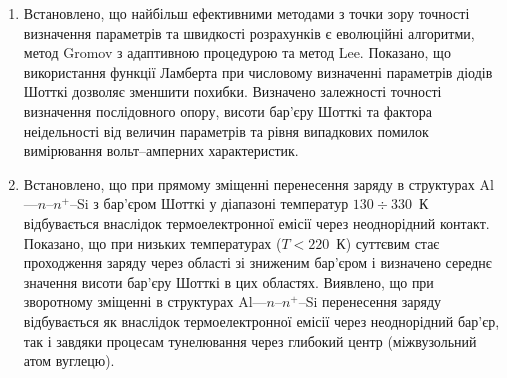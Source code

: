 \begin{enumerate}[leftmargin=0cm,itemindent=3em]
   \item Встановлено, що найбільш ефективними методами з точки зору точності визначення параметрів та швидкості розрахунків є еволюційні алгоритми, метод Gromov з адаптивною процедурою та метод Lee.
    Показано, що використання функції Ламберта при числовому визначенні параметрів діодів Шотткі дозволяє зменшити похибки.
    Визначено залежності точності визначення послідовного опору, висоти бар'єру Шотткі та фактора неідельності від величин параметрів та рівня випадкових помилок вимірювання вольт--амперних характеристик.

   \item
Встановлено, що при прямому зміщенні перенесення заряду в структурах Al---$n$--$n^+$--Si з бар'єром Шотткі у діапазоні температур $130\div330$~К відбувається внаслідок термоелектронної емісії через неоднорідний контакт.
        Показано, що при низьких температурах ($T<220$~К) суттєвим стає проходження заряду через області зі зниженим бар'єром і визначено середнє значення висоти бар'єру Шотткі в цих областях.
     Виявлено, що при зворотному зміщенні в структурах Al---$n$--$n^+$--Si перенесення заряду відбувається як внаслідок термоелектронної емісії через неоднорідний бар'єр, так і завдяки процесам тунелювання через глибокий центр (міжвузольний атом вуглецю).


\end{enumerate}
